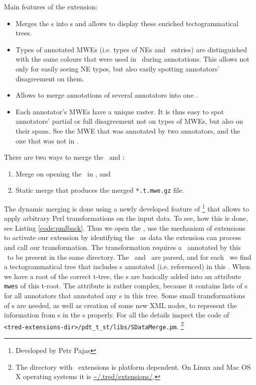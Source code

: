  Main features of the extension:
 \begin{itemize}
\item
Merges the \stf{}s into \tf{}s and allows to display these enriched tectogrammatical trees.
\item
Types of annotated MWEs (i.e. types of NEs and \semlex\ entries) are distinguished with the same colours that were used in \seman\ during annotations. This allows not only for easily seeing NE types, but also easily spotting annotators' disagreement on them. 
\item
Allows to merge annotations of several annotators into one \tf. 
\item
Each annotator's MWEs have a unique raster. It is thus easy to spot annotators' partial or full disagreement not on types of MWEs, but also on their spans. See the MWE that was annotated by two annotators, and the one that was not in .
\end{itemize}

 There are two ways to merge the \sdata\ and \tdata: 
 \begin{enumerate}
\item
Merge on opening the \stf\ in \tred, and
\item
Static merge that produces the merged \verb=*.t.mwe.gz= file. 
\end{enumerate}
The dynamic merging is done using a newly developed feature of \tred\footnote{Developed by Petr Pajas} that allows to apply arbitrary Perl transformations on the input data. To see, how this is done, see Listing \ref{code:pmlback}. Thus we open the \stf, use the mechanism of extensions to activate our extension by identifying the \stf\ as data the extension can process and call our transformation. The transformation requires a \tf\ annotated by this \sf\ to be present in the same directory. The \tf\ and \sf\ are parsed, and for each \stn\ we find a tectogrammatical tree that includes \tn{}s annotated (i.e. referenced) in this \stn. When we have a root of the correct t-tree, the \stn{}s are basically added into an attribute \texttt{mwes} of this t-root. The attribute is rather complex, because it contains lists of \stn{}s for all annotators that annotated any \stn{}s in this tree. Some small transformations of \stn{}s are needed, as well as creation of some new XML nodes, to represent the information from \sf{}s in the \tf{}s properly. For all the details inspect the code of \verb=<tred-extensions-dir>/pdt_t_st/libs/SDataMerge.pm=.%
\footnote{The directory with \tred\ extensions is platform dependent. On Linux and Mac OS X operating systems it is \url{~/.tred/extensions/}.}

